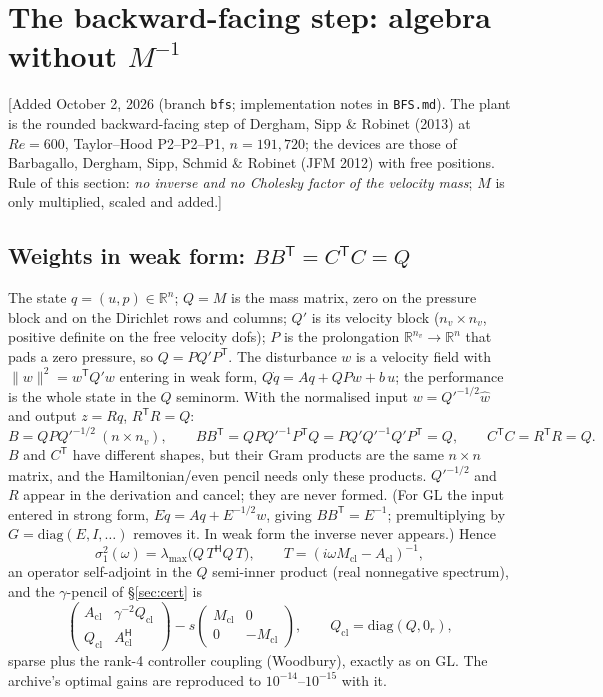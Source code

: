 \documentclass[11pt,a4paper]{article}
\newcommand{\code}[1]{\texttt{#1}}
\newcommand{\R}{\mathbb{R}}
\newcommand{\hp}{^{\mathsf H}}
\newcommand{\tp}{^{\mathsf T}}   %
\begin{document}
{%
\section{The backward-facing step: algebra without $M^{-1}$}\label{sec:bfs}

{\small [Added October 2, 2026 (branch \code{bfs}; implementation notes in \code{BFS.md}).
The plant is the rounded backward-facing step of Dergham, Sipp \& Robinet (2013) at
$Re=600$, Taylor--Hood P2--P2--P1, $n=191{,}720$; the devices are those of Barbagallo,
Dergham, Sipp, Schmid \& Robinet (JFM 2012) with free positions.  Rule of this section:
\emph{no inverse and no Cholesky factor of the velocity mass}; $M$ is only multiplied,
scaled and added.]}

\subsection{Weights in weak form: $BB\tp=C\tp C=Q$}
The state $q=(u,p)\in\R^n$; $Q=M$ is the mass matrix, zero on the pressure block and on the
Dirichlet rows and columns; $Q'$ is its velocity block ($n_v\times n_v$, positive definite on
the free velocity dofs); $P$ is the prolongation $\R^{n_v}\to\R^n$ that pads a zero pressure,
so $Q=PQ'P\tp$.  The disturbance $w$ is a velocity field with $\|w\|^2=w\tp Q'w$ entering in
weak form, $Q\dot q=Aq+QPw+b\,u$; the performance is the whole state in the $Q$ seminorm.  With
the normalised input $w=Q'^{-1/2}\hat w$ and output $z=Rq$, $R\tp R=Q$:
\[
B=QPQ'^{-1/2}\ (n\times n_v),\qquad
BB\tp=QPQ'^{-1}P\tp Q=PQ'Q'^{-1}Q'P\tp=Q,\qquad
C\tp C=R\tp R=Q .
\]
$B$ and $C\tp$ have different shapes, but their Gram products are the same $n\times n$
matrix, and the Hamiltonian/even pencil needs only these products.  $Q'^{-1/2}$ and $R$
appear in the derivation and cancel; they are never formed.  (For GL the input entered in
strong form, $E\dot q=Aq+E^{-1/2}w$, giving $BB\tp=E^{-1}$; premultiplying by
$G=\mathrm{diag}(E,I,\dots)$ removes it.  In weak form the inverse never appears.)  Hence
\[
\sigma_1^2(\omega)=\lambda_{\max}\bigl(Q\,T\hp Q\,T\bigr),\qquad T=(i\omega M_{\mathrm{cl}}-A_{\mathrm{cl}})^{-1},
\]
an operator self-adjoint in the $Q$ semi-inner product (real nonnegative spectrum), and
the $\gamma$-pencil of \S\ref{sec:cert} is
\[
\begin{pmatrix}A_{\mathrm{cl}}&\gamma^{-2}Q_{\mathrm{cl}}\\ Q_{\mathrm{cl}}&A_{\mathrm{cl}}\hp\end{pmatrix}
-s\begin{pmatrix}M_{\mathrm{cl}}&0\\0&-M_{\mathrm{cl}}\end{pmatrix},
\qquad Q_{\mathrm{cl}}=\mathrm{diag}(Q,0_r),
\]
sparse plus the rank-4 controller coupling (Woodbury), exactly as on GL.  The archive's
optimal gains are reproduced to $10^{-14}$--$10^{-15}$ with it.

}
\end{document}
